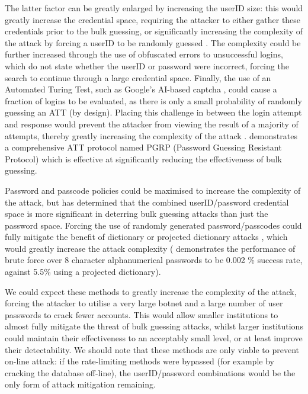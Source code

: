 \documentclass[british,10pt,a4paper]{article}
\begin{document}
The latter factor can be greatly enlarged by increasing the userID size: this would greatly increase the credential space, requiring the attacker to either gather these credentials prior to the bulk guessing, or significantly increasing the complexity of the attack by forcing a userID to be randomly guessed \cite{Kosamkar_undated-ik}. The complexity could be further increased through the use of obfuscated errors to unsuccessful logins, which do not state whether the userID or password were incorrect, forcing the search to continue through a large credential space. Finally, the use of an Automated Turing Test, such as Google's AI-based captcha \cite{noauthor_undated-lk}, could cause a fraction of logins to be evaluated, as there is only a small probability of randomly guessing an ATT (by design). Placing this challenge in between the login attempt and response would prevent the attacker from viewing the result of a majority of attempts, thereby greatly increasing the complexity of the attack \cite{Alsaleh2012-ek}. \citet{Alsaleh2012-ek} demonstrates a comprehensive ATT protocol named PGRP (Password Guessing Resistant Protocol) which is effective at significantly reducing the effectiveness of bulk guessing.

Password and passcode policies could be maximised to increase the complexity of the attack, but \citet{Florencio2007-yp} has determined that the combined userID/password credential space is more significant in deterring bulk guessing attacks than just the password space. Forcing the use of randomly generated password/passcodes could fully mitigate the benefit of dictionary or projected dictionary attacks \cite{Kosamkar_undated-ik}, which would greatly increase the attack complexity (\citet{Aspinall2013-sh} demonstrates the performance of brute force over 8 character alphanumerical passwords to be 0.002 \% success rate, against 5.5\% using a projected dictionary).

We could expect these methods to greatly increase the complexity of the attack, forcing the attacker to utilise a very large botnet and a large number of user passwords to crack fewer accounts. This would allow smaller institutions to almost fully mitigate the threat of bulk guessing attacks, whilst larger institutions could maintain their effectiveness to an acceptably small level, or at least improve their detectability. We should note that these methods are only viable to prevent on-line attack: if the rate-limiting methods were bypassed (for example by cracking the database off-line), the userID/password combinations would be the only form of attack mitigation remaining.
\end{document}
